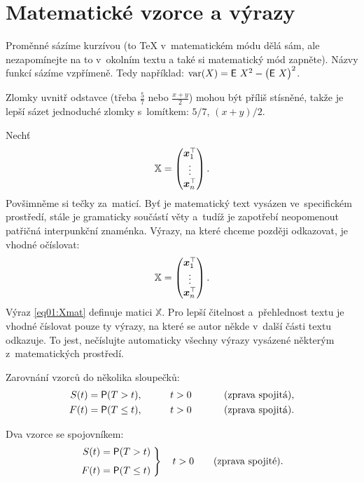 \section{Matematické vzorce a výrazy}

Proměnné sázíme kurzívou (to \TeX{} v~matematickém módu dělá sám, ale
nezapomínejte na to v~okolním textu a také si matematický mód zapněte).
Názvy funkcí sázíme vzpřímeně. Tedy například:
$\operatorname{\textrm{var}}(X) = \operatorname{\textsf{E}\,} X^2 - \bigl(\operatorname{\textsf{E}\,} X \bigr)^2$.

Zlomky uvnitř odstavce (třeba $\frac{5}{7}$ nebo $\frac{x+y}{2}$) mohou
být příliš stísněné, takže je lepší sázet jednoduché zlomky s~lomítkem:
$5/7$, $(x+y)/2$.

Nechť
\[   %
      \mathbb{X} = \begin{pmatrix}
            \T{\bm x_1} \\
            \vdots      \\
            \T{\bm x_n}
      \end{pmatrix}.
\]
Povšimněme si tečky za~maticí. Byť je matematický text vysázen
ve~specifickém prostředí, stále je gramaticky součástí věty a~tudíž je
zapotřebí neopomenout patřičná interpunkční znaménka. Výrazy, na které
chceme později odkazovat, je vhodné očíslovat:
\begin{equation}\label{eq01:Xmat}
      \mathbb{X} = \begin{pmatrix}
            \bm x_1^\top \\
            \vdots      \\
            \bm x_n^\top
      \end{pmatrix}.
\end{equation}
Výraz \eqref{eq01:Xmat} definuje matici $\mathbb{X}$. Pro lepší čitelnost
a~přehlednost textu je vhodné číslovat pouze ty výrazy, na které se
autor někde v~další části textu odkazuje. To jest, nečíslujte
automaticky všechny výrazy vysázené některým z~matematických
prostředí.

Zarovnání vzorců do několika sloupečků:
\begin{alignat*}{3}
      S(t) & = \operatorname{\textsf{P}}(T > t),    & \qquad t & >0 & \qquad & \text{ (zprava spojitá),} \\
      F(t) & = \operatorname{\textsf{P}}(T \leq t), & \qquad t & >0 & \qquad & \text{ (zprava spojitá).}
\end{alignat*}

Dva vzorce se spojovníkem:
\begin{equation}\label{eq01:FS}
      \left.
      \begin{aligned}
            S(t) & = \pr(T > t)    \\[1ex]
            F(t) & = \pr(T \leq t)
      \end{aligned}
      \;	%
      \right\}
      \quad t>0 \qquad \text{(zprava spojité).}
\end{equation}

